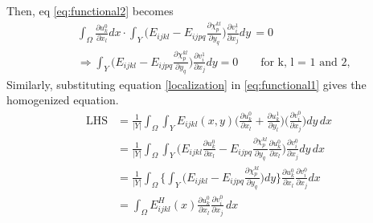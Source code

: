 \documentclass[10pt]{article}
\begin{document}
Then, eq \eqref{eq:functional2} becomes
\begin{align}
&\int_\Omega\frac{\partial u_{k}^0}{\partial x_l}dx\cdot\int_Y \bigg (E_{ijkl}-E_{ijpq}\frac{\partial \chi^{kl}_p}{\partial y_q}\bigg )\frac{\partial v_{i}^1}{\partial x_j} dy\,=0\\
\label{eq:homogenized1}
&\Rightarrow \int_Y \bigg (E_{ijkl}-E_{ijpq}\frac{\partial \chi^{kl}_p}{\partial y_q}\bigg )\frac{\partial v_{i}^1}{\partial x_j} dy=0  \qquad \text{for k, l = 1 and 2,}
\end{align}
Similarly, substituting equation \eqref{localization} in \eqref{eq:functional1} gives the homogenized equation.
\begin{align*}
\text{LHS}&=\frac{1}{|Y|}\int_\Omega\int_Y E_{ijkl}(x,y)\bigg (\frac{\partial u_{k}^0}{\partial x_l}+\frac{\partial u_{k}^1}{\partial y_l}\bigg )\bigg (\frac{\partial v_{i}^0}{\partial x_j}\bigg ) dy\,dx\\
&=\frac{1}{|Y|}\int_\Omega\int_Y \bigg (E_{ijkl}\frac{\partial u_{k}^0}{\partial x_l}-E_{ijpq}\frac{\partial \chi^{kl}_p}{\partial y_q}\frac{\partial u_{k}^0}{\partial x_l}\bigg )\frac{\partial v_{i}^0}{\partial x_j} dy\,dx\\
&=\frac{1}{|Y|}\int_\Omega\Bigg \{\int_Y \bigg (E_{ijkl}-E_{ijpq}\frac{\partial \chi^{kl}_p}{\partial y_q}\bigg )dy\Bigg \}\frac{\partial u_{k}^0}{\partial x_l}\frac{\partial v_{i}^0}{\partial x_j}dx\\
&=\int_\Omega E^H_{ijkl}(x)\frac{\partial u_{k}^0}{\partial x_l}\frac{\partial v_{i}^0}{\partial x_j}\,dx
\end{align*}
\end{document}
